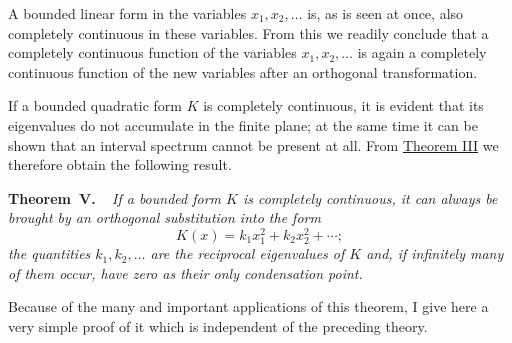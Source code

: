 \documentclass[b5paper,twoside]{article}
\makeatletter
\newcommand{\hilbertstatementname}[2]{%
  \textbf{#1\if\relax\detokenize{#2}\relax\else\ #2\fi.}%
}
\newenvironment{theorem}[1][]{%
  \par\addvspace{.7\baselineskip}%
  \phantomsection
  \protected@edef\@currentlabel{#1}%
  \noindent\hilbertstatementname{Theorem}{#1}\ \itshape\ignorespaces
}{%
  \par\addvspace{.7\baselineskip}%
}
\newcommand{\originalpage}[1]{\phantomsection\label{origpage:#1}}
\makeatother
\begin{document}
A bounded linear form in the variables $x_1,x_2,\ldots$ is, as is seen at
once, also completely continuous in these variables.  From this we readily
conclude that a completely continuous function of the variables
$x_1,x_2,\ldots$ is again a completely continuous function of the new
variables after an orthogonal transformation.

If a bounded quadratic form $K$ is completely continuous, it is evident that
its eigenvalues do not accumulate in the finite plane; at the same time it
can be shown that an interval spectrum cannot be present at all.  From
\hyperref[thm:III]{Theorem III} we therefore obtain the following result.

\originalpage{201}
\begin{theorem}[V]\label{thm:V}
If a bounded form $K$ is completely continuous, it can always be brought by
an orthogonal substitution into the form
\begin{equation}
\tag{83}\label{eq:83}
  K(x)=k_1x_1^2+k_2x_2^2+\cdots;
\end{equation}
the quantities $k_1,k_2,\ldots$ are the reciprocal eigenvalues of $K$ and,
if infinitely many of them occur, have zero as their only condensation point.
\end{theorem}

Because of the many and important applications of this theorem, I give here
a very simple proof of it which is independent of the preceding theory.
\end{document}

